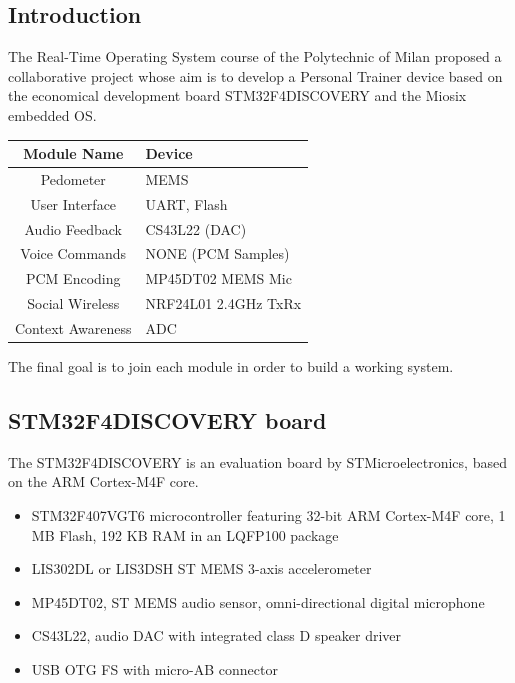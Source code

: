 \documentclass[a4paper,10pt]{article}
\makeatletter
\newenvironment{tablehere}{\def\@captype{table}\vspace{2ex}}{\vspace{1ex}}
\makeatother
\begin{document}
\vspace{4ex}	%
\begin{multicols}{2}

\section{Introduction}
The Real-Time Operating System course of the Polytechnic of Milan proposed a collaborative project whose aim is to develop a Personal Trainer device
based on the economical development board STM32F4DISCOVERY and the 
Miosix embedded OS. 


\begin{tablehere}
\centering
\begin{tabular}{|c|l|} \hline
{\bf Module Name} & {\bf Device}\\ \hline
Pedometer & MEMS \\
User Interface & UART, Flash\\
Audio Feedback & CS43L22 (DAC) \\
Voice Commands & NONE (PCM Samples) \\
PCM Encoding & MP45DT02 MEMS Mic\\
Social Wireless & NRF24L01 2.4GHz TxRx\\
Context Awareness & ADC \\ \hline
\end {tabular}
\caption{Group modules} 
\end{tablehere} 


The final goal is to join each module in order to build a working system.

\subsection{STM32F4DISCOVERY board}

The STM32F4DISCOVERY is an evaluation board by STMicroelectronics, based on the ARM Cortex-M4F core.

{\small
\begin{itemize}
\item STM32F407VGT6 microcontroller featuring 32-bit ARM Cortex-M4F core, 1 MB Flash, 192 KB RAM in an LQFP100 package
\item LIS302DL or LIS3DSH ST MEMS 3-axis accelerometer
\item MP45DT02, ST MEMS audio sensor, omni-directional digital microphone
\item CS43L22, audio DAC with integrated class D speaker driver
\item USB OTG FS with micro-AB connector
\end{itemize}
}


\end{multicols}
\end{document}
